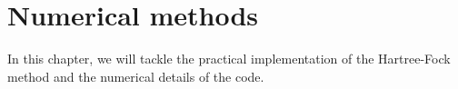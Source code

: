 \chapter{Numerical methods}
In this chapter, we will tackle the practical implementation of the Hartree-Fock method and the numerical details of the code.



